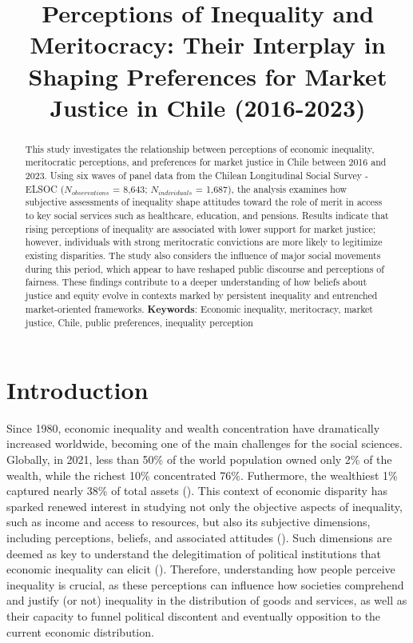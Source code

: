 \documentclass[
  12pt,
]{article}
\title{Perceptions of Inequality and Meritocracy: Their Interplay in
Shaping Preferences for Market Justice in Chile (2016-2023)}
\date{}
\begin{document}
\maketitle
\begin{abstract}
This study investigates the relationship between perceptions of economic
inequality, meritocratic perceptions, and preferences for market justice
in Chile between 2016 and 2023. Using six waves of panel data from the
Chilean Longitudinal Social Survey - ELSOC (\(N_{observations}\) =
8,643; \(N_{individuals}\) = 1,687), the analysis examines how
subjective assessments of inequality shape attitudes toward the role of
merit in access to key social services such as healthcare, education,
and pensions. Results indicate that rising perceptions of inequality are
associated with lower support for market justice; however, individuals
with strong meritocratic convictions are more likely to legitimize
existing disparities. The study also considers the influence of major
social movements during this period, which appear to have reshaped
public discourse and perceptions of fairness. These findings contribute
to a deeper understanding of how beliefs about justice and equity evolve
in contexts marked by persistent inequality and entrenched
market-oriented frameworks. \newline \textbf{Keywords}: Economic
inequality, meritocracy, market justice, Chile, public preferences,
inequality perception
\end{abstract}

\section{Introduction}\label{introduction}

Since 1980, economic inequality and wealth concentration have
dramatically increased worldwide, becoming one of the main challenges
for the social sciences. Globally, in 2021, less than 50\% of the world
population owned only 2\% of the wealth, while the richest 10\%
concentrated 76\%. Futhermore, the wealthiest 1\% captured nearly 38\%
of total assets (). This context of economic disparity has sparked renewed interest
in studying not only the objective aspects of inequality, such as income
and access to resources, but also its subjective dimensions, including
perceptions, beliefs, and associated attitudes
(). Such dimensions
are deemed as key to understand the delegitimation of political
institutions that economic inequality can elicit
().
Therefore, understanding how people perceive inequality is crucial, as
these perceptions can influence how societies comprehend and justify (or
not) inequality in the distribution of goods and services, as well as
their capacity to funnel political discontent and eventually opposition
to the current economic distribution.
\end{document}
